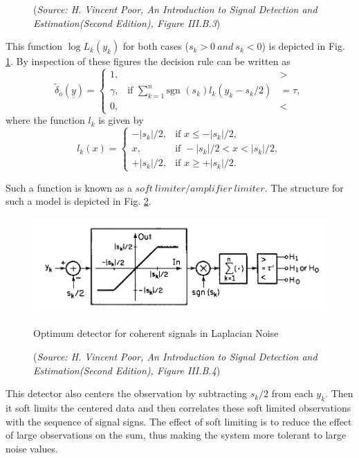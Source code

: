 \documentclass[a4paper,english,12pt]{article}
\begin{document}
\begin{exmp}
\begin{figure}[h]
\caption*{\footnotesize(\textit{Source: H. Vincent Poor, An Introduction to Signal Detection and Estimation(Second Edition), Figure	 III.B.3})}
\label{fig:Fig2}
\end{figure}
\par This function $\log L_{k}(y_{k})$ for both cases ($s_{k}>0\ and\ s_{k}<0$) is depicted in Fig. \ref{fig:Fig2}. By inspection of these figures the decision rule can be written as
\begin{equation}
\tilde\delta_{o}(\underline{y})=\begin{cases}
1,&>\\
\gamma,\hspace{10pt}\text{if }\sum_{k=1}^{n}\text{sgn }(s_{k})l_{k}(y_{k}-s_{k}/2)&=\tau,\\
0,&<
\end{cases}
\end{equation}
where the function $l_{k}$ is given by
\begin{equation}
l_{k}(x)=\begin{cases}
-|s_{k}|/2,&\text{if }x\leq-|s_{k}|/2,\\
x,&\text{if }-|s_{k}|/2<x<|s_{k}|/2,\\
+|s_{k}|/2,&\text{if }x\geq+|s_{k}|/2.
\end{cases}
\end{equation}
\par Such a function is known as a $soft\ limiter/amplifier\ limiter$. The structure for such a model is depicted in Fig. \ref{fig:Fig3}.
\begin{figure}[h]
\centering
\captionsetup{justification=centering}
\includegraphics[width=0.8\linewidth]{Figures/lec10Fig3}
\caption{Optimum detector for coherent signals in Laplacian Noise}
\caption*{\footnotesize(\textit{Source: H. Vincent Poor, An Introduction to Signal Detection and Estimation(Second Edition), Figure	 III.B.4})}
\label{fig:Fig3}
\end{figure}
\par This detector also centers the observation by subtracting $s_{k}/2$ from each $y_{k}$. Then it soft limits the centered data and then correlates these soft limited observations with the sequence of signal signs. The effect of soft limiting is to reduce the effect of large observations on the sum, thus making the system more tolerant to large noise values.
\end{exmp}
\end{document}
